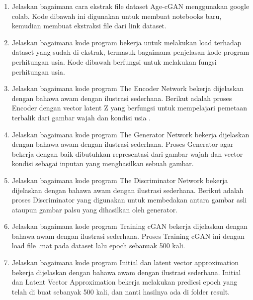     \begin{enumerate}
	\item Jelaskan bagaimana cara ekstrak ﬁle dataset Age-cGAN menggunakan google colab.
    Kode dibawah ini digunakan untuk membuat notebooks baru, kemudian membuat ekstraksi file dari link dataset.
	

	\item Jelaskan bagaimana kode program bekerja untuk melakukan load terhadap dataset yang sudah di ekstrak, termasuk bagaimana penjelasan kode program perhitungan usia.
    Kode dibawah berfungsi untuk melakukan fungsi perhitungan usia.
	

	\item Jelaskan bagaimana kode program The Encoder Network bekerja dijelaskan dengan bahawa awam dengan ilustrasi sederhana.
    Berikut adalah proses Encoder dengan vector latent Z yang berfungsi untuk mempelajari pemetaan terbalik dari gambar wajah dan kondisi usia .
	

	\item Jelaskan bagaimana kode program The Generator Network bekerja dijelaskan dengan bahawa awam dengan ilustrasi sederhana.
    Proses Generator agar bekerja dengan baik dibutuhkan representasi dari gambar wajah dan vector kondisi sebagai inputan yang menghasilkan sebuah gambar.
	

    \item Jelaskan bagaimana kode program The Discriminator Network bekerja dijelaskan dengan bahawa awam dengan ilustrasi sederhana.
    Berikut adalah proses Discriminator yang digunakan untuk membedakan antara gambar asli ataupun gambar palsu yang dihasilkan oleh generator.
	

    \item Jelaskan bagaimana kode program Training cGAN bekerja dijelaskan dengan bahawa awam dengan ilustrasi sederhana.
    Proses Training cGAN ini dengan load file .mat pada dataset lalu epoch sebanuak 500 kali.

	

    \item Jelaskan bagaimana kode program Initial dan latent vector approximation bekerja dijelaskan dengan bahawa awam dengan ilustrasi sederhana.
    Initial dan Latent Vector Approximation bekerja melakukan predicsi epoch yang telah di buat sebanyak 500 kali, dan nanti hasilnya ada di folder result.

	

\end{enumerate}

